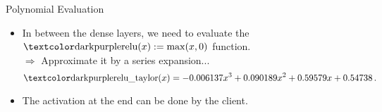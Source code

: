 \begin{frame}{Polynomial Evaluation}
  \begin{itemize}
    \item In between the dense layers, we need to evaluate the $\cryptop{relu}(x) := \max(x, 0)$ function. \\
          $\Rightarrow$ Approximate it by a series expansion...
          $$\cryptop{relu\_taylor}(x) = -0.006137 x^3 + 0.090189 x^2 + 0.59579 x + 0.54738 \,.$$
    \item The  activation at the end can be done by the client.
  \end{itemize}

  \begin{figure}[H]
    \centering
    \label{fig:taylor-relu}
  \end{figure}
\end{frame}

